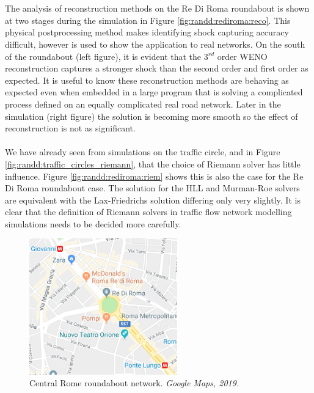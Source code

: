 	\\ \\
	The analysis of reconstruction methods on the Re Di Roma roundabout is shown at two stages during the simulation in Figure \ref{fig:randd:rediroma:reco}. This physical postprocessing method makes identifying shock capturing accuracy difficult, however is used to show the application to real networks. On the south of the roundabout (left figure), it is evident that the 3$^{rd}$ order WENO reconstruction captures a stronger shock than the second order and first order as expected. It is useful to know these reconstruction methods are behaving as expected even when embedded in a large program that is solving a complicated process defined on an equally complicated real road network. Later in the simulation (right figure) the solution is becoming more smooth so the effect of reconstruction is not as significant. 
	\\ \\
	We have already seen from simulations on the traffic circle, and in Figure \ref{fig:randd:traffic_circles_riemann}, that the choice of Riemann solver has little influence. Figure \ref{fig:randd:rediroma:riem} shows this is also the case for the Re Di Roma roundabout case. The solution for the HLL and Murman-Roe solvers are equivalent with the Lax-Friedrichs solution differing only very slightly. It is clear that the definition of Riemann solvers in traffic flow network modelling simulations needs to be decided more carefully. 
	
	\begin{figure}
    		\centering
        		\includegraphics[trim=0 0 0 0,clip,width=0.57\textwidth]{RDR_map.png}
		\caption[Re Di Roma : Junction area map]{Central Rome roundabout network. \emph{Google Maps, 2019.}}
		\label{fig:randd:RDR:map}
	\end{figure}

